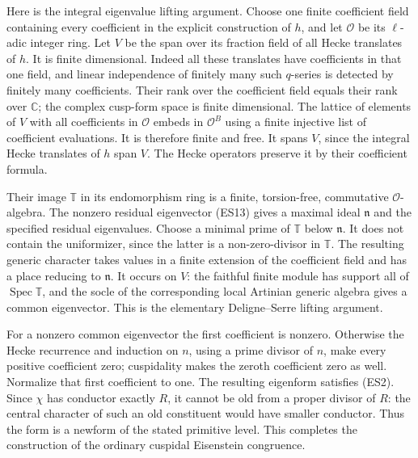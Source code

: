 Here is the integral eigenvalue lifting argument.
Choose one finite coefficient field containing every
coefficient in the explicit construction of \(h\), and let
\(\mathcal O\) be its \(\ell\)-adic integer ring.
Let \(V\) be the span over its fraction field of all Hecke
translates of \(h\).
It is finite dimensional.
Indeed all these translates have coefficients in that one
field, and linear independence of finitely many such
\(q\)-series is detected by finitely many coefficients.
Their rank over the coefficient field equals their rank
over \(\mathbb C\); the complex cusp-form space is finite
dimensional.
The lattice of elements of \(V\) with all coefficients
in \(\mathcal O\) embeds in \(\mathcal O^B\) using a finite
injective list of coefficient evaluations.
It is therefore finite and free.
It spans \(V\), since the integral Hecke translates of \(h\)
span \(V\).
The Hecke operators preserve it by their coefficient formula.

Their image \(\mathbb T\) in its endomorphism ring is a
finite, torsion-free, commutative \(\mathcal O\)-algebra.
The nonzero residual eigenvector (ES13) gives a maximal
ideal \(\mathfrak n\) and the specified residual eigenvalues.
Choose a minimal prime of \(\mathbb T\) below \(\mathfrak n\).
It does not contain the uniformizer, since the latter is a
non-zero-divisor in \(\mathbb T\).
The resulting generic character takes values in a finite
extension of the coefficient field and has a place reducing
to \(\mathfrak n\).
It occurs on \(V\): the faithful finite module has support
all of \(\operatorname{Spec}\mathbb T\), and the socle of
the corresponding local Artinian generic algebra gives a
common eigenvector.
This is the elementary Deligne--Serre lifting argument.

For a nonzero common eigenvector the first coefficient is
nonzero.
Otherwise the Hecke recurrence and induction on \(n\), using
a prime divisor of \(n\), make every positive coefficient
zero; cuspidality makes the zeroth coefficient zero as well.
Normalize that first coefficient to one.
The resulting eigenform satisfies (ES2).
Since \(\chi\) has conductor exactly \(R\), it cannot be
old from a proper divisor of \(R\): the central character
of such an old constituent would have smaller conductor.
Thus the form is a newform of the stated primitive level.
This completes the construction of the ordinary cuspidal
Eisenstein congruence.

